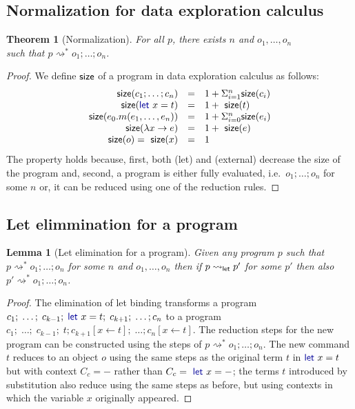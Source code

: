 \documentclass[english,crc,references=cleveref]{programming}
\newcounter{thc}
\theoremstyle{plain}
\newtheorem{lem}[thc]{Lemma}
\newtheorem{theorem}[thc]{Theorem}
\theoremstyle{definition}
\newcommand{\ident}[1]{\textnormal{\textcolor{idclr}{\sffamily #1}}}
\newcommand{\kvd}[1]{\textnormal{\textcolor{kvdclr}{\sffamily #1}}}
\newcommand{\rname}[1]{{\sffamily(#1)}}
\begin{document}
\subsection{Normalization for data exploration calculus}
\label{sec:app-normalization}

\begin{theorem}[Normalization]
For all $p$, there exists $n$ and $o_1, \ldots, o_n$ \\
such that $p\rightsquigarrow^{*} o_1;\ldots;o_n$.
\end{theorem}
\begin{proof}
We define $\ident{size}$ of a program in data exploration calculus as follows:
\begin{equation}
\begin{array}{rcl}
\ident{size}(c_1; \ldots; c_n) &=& 1 + \Sigma^{n}_{i=1} \ident{size}(c_i)\\
\ident{size}(\kvd{let}~x=t) &=& 1 + \ident{size}(t)\\
\ident{size}(e_0.m(e_1, \ldots, e_n)) &=& 1 + \Sigma^{n}_{i=0} \ident{size}(e_i)\\
\ident{size}(\lambda x\rightarrow e) &=& 1 + \ident{size}(e)\\
\ident{size}(o) = \ident{size}(x) &=& 1\\
\end{array}
\end{equation}
%
%
The property holds because, first, both \rname{let} and \rname{external} decrease the \ident{size}
of the program and, second, a program is either fully evaluated, i.\hairspace e.~$o_1;\ldots;o_n$ for some $n$
or, it can be reduced using one of the reduction rules.
\end{proof}


\subsection{Let elimmination for a program}
\label{sec:let-lang-elimination}

\begin{lem}[Let elimination for a program]
\label{thm:let-lang-elimination-proof}
Given any program $p$ such that $p \rightsquigarrow^{*} o_1;\ldots;o_n$ for some $n$ and $o_1, \ldots, o_n$
then if $p \rightsquigarrow_\ident{let} p'$ for some $p'$ then also $p' \rightsquigarrow^{*} o_1;\ldots;o_n$.
\end{lem}
\begin{proof}
The elimination of let binding transforms a program $c_1;\; \ldots;\; c_{k-1};\; \kvd{let}~x=t;\; c_{k+1};\; \ldots; c_n$
to a program $c_1;\; \ldots;\; c_{k-1};\; t; c_{k+1}[x\leftarrow t];\; \ldots; c_n[x\leftarrow t]$.
The reduction steps for the new program can be constructed using the steps of $p \rightsquigarrow^{*} o_1;\ldots;o_n$.
The new command $t$ reduces to an object $o$ using the same steps as the original term $t$
in $\kvd{let}~x=t$ but with context $C_c = -$ rather than $C_c = \kvd{let}~x=-$; the terms $t$
introduced by substitution also reduce using the same steps as before, but using
contexts in which the variable $x$ originally appeared.
\end{proof}
\end{document}
